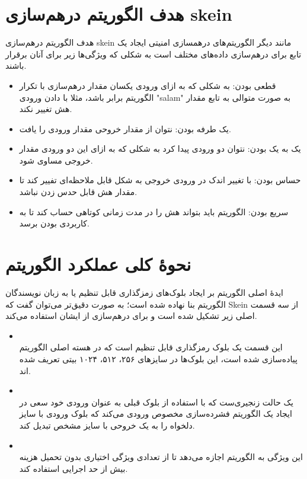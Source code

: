 \section{هدف الگوریتم درهم‌سازی skein}	
هدف الگوریتم درهم‌سازی skein مانند دیگر الگوریتم‌های درهمسازی امنیتی ایجاد یک تابع برای درهم‌سازی داده‌های مختلف است به شکلی که ویژگی‌ها زیر برای آنان برقرار باشند.

\begin{itemize}
\item قطعی بودن:
به شکلی که به ازای ورودی یکسان مقدار در‌هم‌سازی با تکرار الگوریتم برابر باشد، مثلا با دادن ورودی "salam" به صورت متوالی به تابع مقدار هش تغییر نکند. 
\item یک طرفه بودن:
نتوان از مقدار خروحی مقدار ورودی را یافت. 
\item
یک به یک بودن:
نتوان دو ورودی پیدا کرد به شکلی که به ازای این دو ورودی مقدار خروجی مساوی شود.
\item حساس بودن:
با تغییر اندک در ورودی خروجی به شکل قابل ملاحظه‌ای تفییر کند تا مقدار هش قابل حدس زدن نباشد.
\item
سریع بودن: 
الگوریتم باید بتواند هش را در مدت زمانی کوتاهی حساب کند تا به کاربردی بودن برسد.

\end{itemize}


\section{نحوهٔ کلی عملکرد الگوریتم}
ایدهٔ اصلی الگوریتم بر ایجاد بلوک‌های زمزگذاری قابل تنظیم یا به زبان نویسندگان الگوریتم
بنا نهاده شده است؛ به صورت دقیق‌تر می‌توان گفت که
Skein 
از سه قسمت اصلی زیر تشکیل شده است و برای درهم‌سازی از ایشان استفاده می‌کند.
\begin{itemize}
\item
{}\\
این قسمت یک بلوک رمزگذاری قابل تنظیم است که در هسته اصلی الگوریتم پیاده‌سازی شده است، این بلوک‌ها در سایزهای ۲۵۶، ۵۱۲، ۱۰۲۴ بیتی تعریف شده اند.
\item
{}\\
یک حالت زنجیری‌ست که با استفاده از بلوک قبلی به عنوان ورودی خود سعی در ایجاد یک الگوریتم فشرده‌سازی مخصوص ورودی می‌کند که بلوک ورودی با سایز دلخواه را به یک خروحی با سایز مشخص تبدیل کند.
\item
{}\\
این ویژگی به الگوریتم اجازه می‌دهد تا از تعدادی ویژگی اختیاری بدون تحمیل هزینه بیش از حد اجرایی استفاده کند. 
\cite{main_doc}
\end{itemize}
	
\begin{thebibliography}{1}


  
  
\end{thebibliography}
